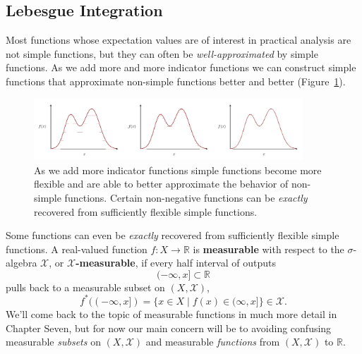 \documentclass[
  letterpaper,
  DIV=11,
  numbers=noendperiod]{scrartcl}
\begin{document}
\hypertarget{lebesgue-integration}{%
\subsection{Lebesgue Integration}\label{lebesgue-integration}}

Most functions whose expectation values are of interest in practical
analysis are not simple functions, but they can often be
\emph{well-approximated} by simple functions. As we add more and more
indicator functions we can construct simple functions that approximate
non-simple functions better and better (Figure~\ref{fig-simple-approx}).

\begin{figure}

{\centering \includegraphics[width=0.9\textwidth,height=\textheight]{figures/simple_function_approx/simple_function_approx.pdf}

}

\caption{\label{fig-simple-approx}As we add more indicator functions
simple functions become more flexible and are able to better approximate
the behavior of non-simple functions. Certain non-negative functions can
be \emph{exactly} recovered from sufficiently flexible simple
functions.}

\end{figure}

Some functions can even be \emph{exactly} recovered from sufficiently
flexible simple functions. A real-valued function
\(f: X \rightarrow \mathbb{R}\) is \textbf{measurable} with respect to
the \(\sigma\)-algebra \(\mathcal{X}\), or
\textbf{\(\mathcal{X}\)-measurable}, if every half interval of outputs
\[
(-\infty, x] \subset \mathbb{R}
\] pulls back to a measurable subset on \((X, \mathcal{X})\), \[
f^{*}( (-\infty, x] )
=
\{ x \in X \mid f(x) \in (\infty, x] \}
\in \mathcal{X}.
\] We'll come back to the topic of measurable functions in much more
detail in Chapter Seven, but for now our main concern will be to
avoiding confusing measurable \emph{subsets} on \((X, \mathcal{X})\) and
measurable \emph{functions} from \((X, \mathcal{X})\) to \(\mathbb{R}\).
\end{document}
